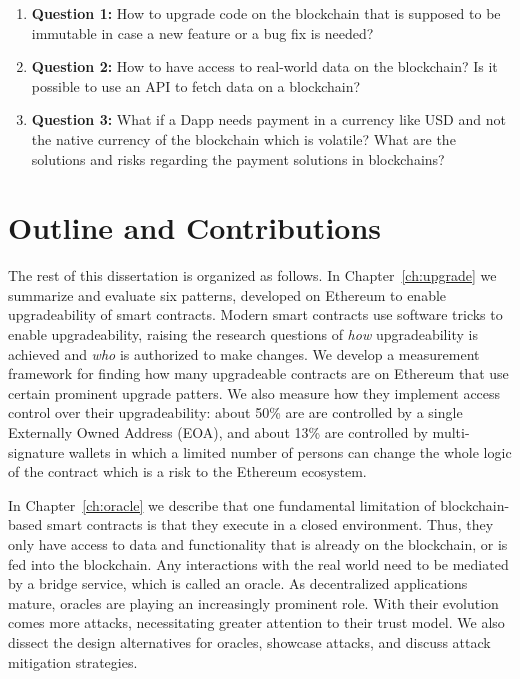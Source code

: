 \begin{enumerate}
    \item \textbf{Question 1:} How to upgrade code on the blockchain that is supposed to be immutable in case a new feature or a bug fix is needed?
    \item \textbf{Question 2:} How to have access to real-world data on the blockchain? Is it possible to use an API to fetch data on a blockchain?
    \item \textbf{Question 3:} What if a Dapp needs payment in a currency like USD and not the native currency of the blockchain which is volatile? What are the solutions and risks regarding the payment solutions in blockchains?
\end{enumerate}


\section{Outline and Contributions}
The rest of this dissertation is organized as follows. In Chapter~\ref{ch:upgrade} we summarize and evaluate six patterns, developed on Ethereum to enable upgradeability of smart contracts. Modern smart contracts use software tricks to enable upgradeability, raising the research questions of \textit{how} upgradeability is achieved and \textit{who} is authorized to make changes. We develop a measurement framework for finding how many upgradeable contracts are on Ethereum that use certain prominent upgrade patters. We also measure how they implement access control over their upgradeability: about 50\% are are controlled by a single Externally Owned Address (EOA), and about 13\% are controlled by multi-signature wallets in which a limited number of persons can change the whole logic of the contract which is a risk to the Ethereum ecosystem.

In Chapter~\ref{ch:oracle} we describe that one fundamental limitation of blockchain-based smart contracts is that they execute in a closed environment. Thus, they only have access to data and functionality that is already on the blockchain, or is fed into the blockchain. Any interactions with the real world need to be mediated by a bridge service, which is called an oracle. As decentralized applications mature, oracles are playing an increasingly prominent role. With their evolution comes more attacks, necessitating greater attention to their trust model. We also dissect the design alternatives for oracles, showcase attacks, and discuss attack mitigation strategies.


